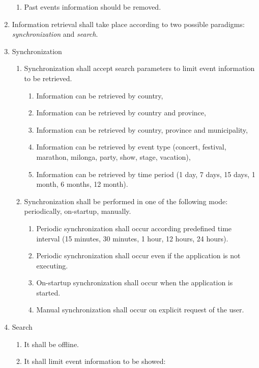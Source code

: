 \documentclass[10pt, twoside]{article}
\begin{document}
\begin{enumerate}
\begin{enumerate}
	        		\item Past events information should be removed.
    		\end{enumerate}
    	\item Information retrieval shall take place according to two possible 
          	paradigms: \emph{synchronization} and \emph{search}.
    	\item Synchronization
    		\begin{enumerate}
        			\item Synchronization shall accept search parameters to limit event information to be retrieved.
        				\begin{enumerate}
            				\item Information can be retrieved by country,
					\item	Information can be retrieved by country and province,
					\item	Information can be retrieved by country, province and municipality,
					\item	Information can be retrieved by event type (concert, festival, marathon, milonga, party, show, stage, vacation),
					\item	Information can be retrieved by time period (1 day, 7 days, 15 days, 1 month, 6 months, 12 month).
        				\end{enumerate}
        			\item Synchronization shall be performed in one of the following mode:
              			periodically, on-startup, manually.
				\begin{enumerate}
					\item Periodic synchronization shall occur according 
						predefined time interval (15 minutes, 30 minutes, 1 hour, 12 hours, 24 hours).
					\item Periodic synchronization shall occur even if the application is not executing.
            				\item On-startup synchronization shall occur when the application is started.
					\item Manual synchronization shall occur on explicit request of the user.
				\end{enumerate}
		\end{enumerate}
	\item Search
    		\begin{enumerate}
        			\item It shall be offline.
			\item It shall limit event information to be showed:

\end{enumerate}
\end{enumerate}
\end{document}
